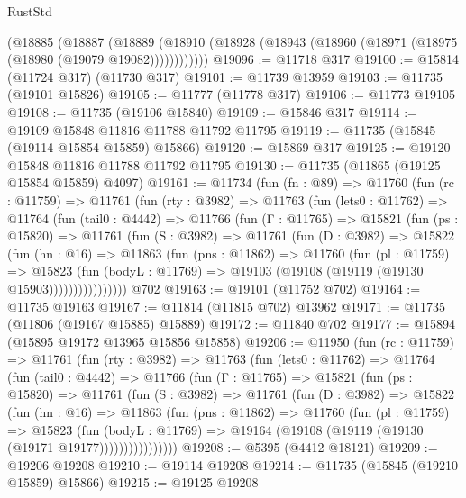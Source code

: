 \begin{lexlean}{RustStd}
\begin{coremodule}
      (@18885
        (@18887
          (@18889 (@18910 (@18928 (@18943 (@18960 (@18971 (@18975 (@18980 (@19079 @19082))))))))))))
@19096 := @11718 @317
@19100 := @15814 (@11724 @317) (@11730 @317)
@19101 := @11739 @13959
@19103 := @11735 (@19101 @15826)
@19105 := @11777 (@11778 @317)
@19106 := @11773 @19105
@19108 := @11735 (@19106 @15840)
@19109 := @15846 @317
@19114 := @19109 @15848 @11816 @11788 @11792 @11795
@19119 := @11735 (@15845 (@19114 @15854 @15859) @15866)
@19120 := @15869 @317
@19125 := @19120 @15848 @11816 @11788 @11792 @11795
@19130 := @11735 (@11865 (@19125 @15854 @15859) @4097)
@19161 := @11734
    (fun (fn : @89) =>
    @11760
      (fun (rc : @11759) =>
      @11761
        (fun (rty : @3982) =>
        @11763
          (fun (lets0 : @11762) =>
          @11764
            (fun (tail0 : @4442) =>
            @11766
              (fun (Γ : @11765) =>
              @15821
                (fun (ps : @15820) =>
                @11761
                  (fun (S : @3982) =>
                  @11761
                    (fun (D : @3982) =>
                    @15822
                      (fun (hn : @16) =>
                      @11863
                        (fun (pns : @11862) =>
                        @11760
                          (fun (pl : @11759) =>
                          @15823
                            (fun (bodyL : @11769) =>
                            @19103 (@19108 (@19119 (@19130 @15903))))))))))))))))
    @702
@19163 := @19101 (@11752 @702)
@19164 := @11735 @19163
@19167 := @11814 (@11815 @702) @13962
@19171 := @11735 (@11806 (@19167 @15885) @15889)
@19172 := @11840 @702
@19177 := @15894 (@15895 @19172 @13965 @15856 @15858)
@19206 := @11950
    (fun (rc : @11759) =>
    @11761
      (fun (rty : @3982) =>
      @11763
        (fun (lets0 : @11762) =>
        @11764
          (fun (tail0 : @4442) =>
          @11766
            (fun (Γ : @11765) =>
            @15821
              (fun (ps : @15820) =>
              @11761
                (fun (S : @3982) =>
                @11761
                  (fun (D : @3982) =>
                  @15822
                    (fun (hn : @16) =>
                    @11863
                      (fun (pns : @11862) =>
                      @11760
                        (fun (pl : @11759) =>
                        @15823
                          (fun (bodyL : @11769) =>
                          @19164 (@19108 (@19119 (@19130 (@19171 @19177))))))))))))))))
@19208 := @5395 (@4412 @18121)
@19209 := @19206 @19208
@19210 := @19114 @19208
@19214 := @11735 (@15845 (@19210 @15859) @15866)
@19215 := @19125 @19208

\end{coremodule}
\end{lexlean}
